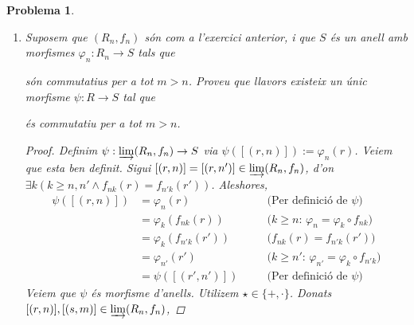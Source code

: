\documentclass[compress]{article}
\newtheorem{problema}{Problema}
\theoremstyle{definition}
\begin{document}
\begin{problema}
    \begin{enumerate}
        \item Suposem que $(R_{n},f_{n})$ són com a l'exercici anterior, i que $S$ és un anell amb morfismes $\varphi_{n}:R_{n}\rightarrow S$ tals que
        \begin{center}
        \end{center}
        són commutatius per a tot $m>n$. Proveu que llavors existeix un únic morfisme $\psi:R\rightarrow S$ tal que
        \begin{center}
        \end{center}
        és commutatiu per a tot $m>n$.
        \begin{proof}
            Definim $\psi:\varinjlim(R_{n},f_{n})\rightarrow S$ via $\psi([(r,n)]):=\varphi_{n}(r)$. Veiem que esta ben definit. Sigui $[(r,n)]=[(r,n')]\in\varinjlim(R_{n},f_{n})$, d'on $\exists k(k\geq n,n'\land f_{nk}(r)=f_{n'k}(r'))$. Aleshores,
            \begin{align*}
                \psi([(r,n)])
                &=\varphi_{n}(r)
                &\quad&\textrm{(Per definició de $\psi$)}\\
                &=\varphi_{k}(f_{nk}(r))
                &\quad&\textrm{($k\geq n$: $\varphi_{n}=\varphi_{k}\circ f_{nk}$)}\\
                &=\varphi_{k}(f_{n'k}(r'))
                &\quad&\textrm{($f_{nk}(r)=f_{n'k}(r')$)}\\
                &=\varphi_{n'}(r')
                &\quad&\textrm{($k\geq n'$: $\varphi_{n'}=\varphi_{k}\circ f_{n'k}$)}\\
                &=\psi([(r',n')])
                &\quad&\textrm{(Per definició de $\psi$)}
            \end{align*}
            Veiem que $\psi$ és morfisme d'anells. Utilizem $\star\in\{+,\cdot\}$. Donats $[(r,n)],[(s,m)]\in\varinjlim(R_{n},f_{n})$,

\end{proof}
\end{enumerate}
\end{problema}
\end{document}

